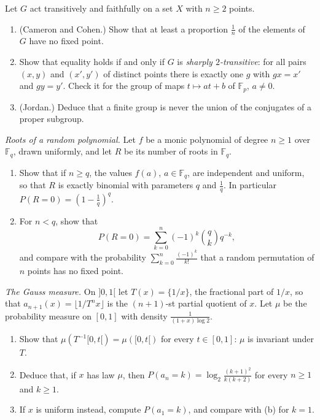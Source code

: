 \begin{exercise}[$\star\star$]\label{pb:derangements}
Let $G$ act transitively and faithfully on a set $X$ with $n\ge2$ points.
\begin{enumerate}[label=(\alph*)]
\item (Cameron and Cohen.) Show that at least a proportion $\frac1n$ of the elements of $G$ have no fixed point.
\item Show that equality holds if and only if $G$ is \emph{sharply $2$-transitive}: for all pairs $(x,y)$ and $(x',y')$ of
distinct points there is exactly one $g$ with $gx=x'$ and $gy=y'$. Check it for the group of maps $t\mapsto at+b$ of
$\mathbb F_p$, $a\ne0$.
\item (Jordan.) Deduce that a finite group is never the union of the conjugates of a proper subgroup.
\end{enumerate}
\end{exercise}

\begin{exercise}[$\star\star$]\label{pb:noroots}
\emph{Roots of a random polynomial.} Let $f$ be a monic polynomial of degree $n\ge1$ over $\mathbb F_q$, drawn uniformly, and let $R$ be its number of roots in $\mathbb F_q$.
\begin{enumerate}[label=(\alph*)]
\item Show that if $n\ge q$, the values $f(a)$, $a\in\mathbb F_q$, are independent and uniform, so that $R$ is exactly binomial
with parameters $q$ and $\frac1q$. In particular $P(R=0)=(1-\frac1q)^q$.
\item For $n<q$, show that
\[
P(R=0)=\sum_{k=0}^n(-1)^k\binom qk q^{-k},
\]
and compare with the probability $\sum_{k=0}^n\frac{(-1)^k}{k!}$ that a random permutation of $n$ points has no fixed point.
\end{enumerate}
\end{exercise}

\begin{exercise}[$\star$]\label{pb:gaussmeasure}
\emph{The Gauss measure.} On $]0,1[$ let $T(x)=\{1/x\}$, the fractional part of $1/x$, so that $a_{n+1}(x)=\lfloor1/T^nx\rfloor$ is the $(n+1)$-st partial quotient of $x$. Let $\mu$ be the probability measure on $[0,1]$ with density $\frac1{(1+x)\log2}$.
\begin{enumerate}[label=(\alph*)]
\item Show that $\mu(T^{-1}[0,t[)=\mu([0,t[)$ for every $t\in[0,1]$: $\mu$ is invariant under $T$.
\item Deduce that, if $x$ has law $\mu$, then $P(a_n=k)=\log_2\frac{(k+1)^2}{k(k+2)}$ for every $n\ge1$ and $k\ge1$.
\item If $x$ is uniform instead, compute $P(a_1=k)$, and compare with (b) for $k=1$.
\end{enumerate}
\end{exercise}

